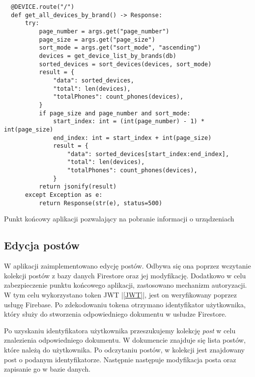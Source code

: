 \begin{code}[H]
  \begin{verbatim}
  @DEVICE.route("/")
  def get_all_devices_by_brand() -> Response:
      try:
          page_number = args.get("page_number")
          page_size = args.get("page_size")
          sort_mode = args.get("sort_mode", "ascending")
          devices = get_device_list_by_brands(db)
          sorted_devices = sort_devices(devices, sort_mode)
          result = {
              "data": sorted_devices,
              "total": len(devices),
              "totalPhones": count_phones(devices),
          }
          if page_size and page_number and sort_mode:
              start_index: int = (int(page_number) - 1) * int(page_size)
              end_index: int = start_index + int(page_size)
              result = {
                  "data": sorted_devices[start_index:end_index],
                  "total": len(devices),
                  "totalPhones": count_phones(devices),
              }
          return jsonify(result)
      except Exception as e:
          return Response(str(e), status=500)    
  \end{verbatim}
  \centering
  \caption{Punkt końcowy aplikacji pozwalający na pobranie informacji o urządzeniach}
  \label{slice_example}
\end{code}

\subsection{Edycja postów}
W aplikacji zaimplementowano edycję postów. Odbywa się ona poprzez wczytanie kolekcji postów z bazy danych Firestore \cite{firestore} oraz jej modyfikację. Dodatkowo w celu zabezpieczenie punktu końcowego aplikacji, zastosowano mechanizm autoryzacji. W tym celu wykorzystano token JWT |\ref{JWT}|, jest on weryfikowany poprzez usługę Firebase. Po zdekodowaniu tokena otrzymano identyfikator użytkownika, który służy do stworzenia odpowiedniego dokumentu w usłudze Firestore. 

Po uzyskaniu identyfikatora użytkownika przeszukujemy kolekcję \textit{post} w celu znalezienia odpowiedniego dokumentu. W dokumencie znajduje się lista postów, które należą do użytkownika. Po odczytaniu postów, w kolekcji jest znajdowany post o podanym identyfikatorze. Następnie następuje modyfikacja posta oraz zapisanie go w bazie danych.

